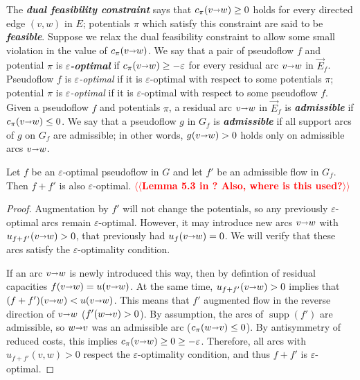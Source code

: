 \documentclass[a4paper,UKenglish]{socg-lipics-v2018}
\makeatletter
\def\note#1{\textcolor{red}{{#1}}}
\def\eps{\varepsilon}
\def\arcto{\mathord\shortrightarrow}
\def\arc#1#2{#1\arcto#2}
\def\supp{\operatorname{supp}}
\theoremstyle{plain}
\numberwithin{figure}{section}
\def\EMPH#1{\textbf{\emph{\boldmath #1}}}
\def\n@te#1{\textsf{\boldmath \textbf{$\langle\!\langle$#1$\rangle\!\rangle$}}\leavevmode}
\def\note#1{\textcolor{red}{\n@te{#1}}}
\makeatother
\begin{document}
The \EMPH{dual feasibility constraint} says that $c_\pi(\arc vw) \geq 0$ holds for every directed edge $(v,w)$ in $E$; potentials $\pi$ which satisfy this constraint are said to be \EMPH{feasible}.
%
%
Suppose we relax the dual feasibility constraint to allow some small violation in the value of $c_\pi(\arc vw)$.
We say that a pair of pseudoflow $f$ and potential $\pi$ is \EMPH{$\eps$-optimal} \cite{tar-spmcc-1985,be-darml-1987} if
$c_\pi(\arc vw) \geq -\eps$ for every residual arc $\arc vw$ in $\vec{E}_f$.  Pseudoflow $f$ is \emph{$\eps$-optimal} if it is $\eps$-optimal with respect to some potentials $\pi$; potential $\pi$ is \emph{$\eps$-optimal} if it is $\eps$-optimal with respect to some pseudoflow $f$.
%
Given a pseudoflow $f$ and potentials $\pi$, a residual arc $\arc vw$ in $\vec{E}_f$ is
\EMPH{admissible} if $c_\pi(\arc vw) \leq 0$.
We say that a pseudoflow $g$ in $G_f$ is \EMPH{admissible} if all support arcs of $g$ on $G_f$ are admissible; in other words, $g(\arc vw) > 0$ holds only on admissible arcs $\arc vw$.

\begin{lemmarep}
\label{lemma:eps_opt_preserve}
Let $f$ be an $\eps$-optimal pseudoflow in $G$ and let $f'$ be an
admissible flow in $G_f$.
Then $f + f'$ is also $\eps$-optimal.
\note{Lemma 5.3 in \cite{GT90}? Also, where is this used?}
\end{lemmarep}

\begin{proof}
Augmentation by $f'$ will not change the potentials, so any previously
$\eps$-optimal arcs remain $\eps$-optimal.
However, it may introduce new arcs $\arc vw$ with $u_{f+f'}(\arc vw) > 0$, that previously had
$u_f(\arc vw) = 0$.
We will verify that these arcs satisfy the $\eps$-optimality condition.

If an arc $\arc vw$ is newly introduced this way, then by defintion of residual
capacities $f(\arc vw) = u(\arc vw)$.
At the same time, $u_{f+f'}(\arc vw) > 0$ implies that $(f+f')(\arc vw) < u(\arc vw)$.
This means that $f'$ augmented flow in the reverse direction of $\arc vw$
($f'(\arc wv) > 0$).
By assumption, the arcs of $\supp(f')$ are admissible, so $\arc wv$ was an
admissible arc ($c_\pi(\arc wv) \leq 0$).
By antisymmetry of reduced costs, this implies $c_\pi(\arc vw) \geq 0 \geq -\eps$.
Therefore, all arcs with $u_{f+f'}(v, w) > 0$ respect the $\eps$-optimality condition,
and thus $f+f'$ is $\eps$-optimal.
\end{proof}
\end{document}
